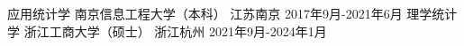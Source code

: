 

\begin{cventries}

  \cventry
    {应用统计学} %
    {南京信息工程大学（本科）} %
    {江苏南京} %
    {2017年9月-2021年6月} %
    {}
  \cventry
    {理学统计学} %
    {浙江工商大学（硕士）} %
    {浙江杭州} %
    {2021年9月-2024年1月} %
    {}

\end{cventries}
